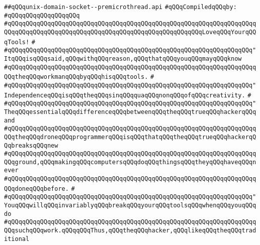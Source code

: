\label{src/lib/std/src/socket/unix-domain-socket--premicrothread.api}
\verb|##qQQqunix-domain-socket--premicrothread.api|\newline
\newline
\verb|#qQQqCompiledqQQqby:|\newline
\verb|#qQQqqQQqqQQqqQQqqQQq|\newline
\newline
\verb|#qQQqqQQqqQQqqQQqqQQqqQQqqQQqqQQqqQQqqQQqqQQqqQQqqQQqqQQqqQQqqQQqqQQqqQQqqQQqqQQqqQQqqQQqqQQqqQQqqQQqqQQqqQQqqQQqqQQqqQQqqQQqLoveqQQqYourqQQqTools!|\newline
\verb|#|\newline
\verb|#qQQqqQQqqQQqqQQqqQQqqQQqqQQqqQQqqQQqqQQqqQQqqQQqqQQqqQQqqQQqqQQqqQQq"ItqQQqisqQQqsaid,qQQqwithqQQqreason,qQQqthatqQQqyouqQQqmayqQQqknow|\newline
\verb|#qQQqqQQqqQQqqQQqqQQqqQQqqQQqqQQqqQQqqQQqqQQqqQQqqQQqqQQqqQQqqQQqqQQqqQQqtheqQQqworkmanqQQqbyqQQqhisqQQqtools.|\newline
\verb|#|\newline
\verb|#qQQqqQQqqQQqqQQqqQQqqQQqqQQqqQQqqQQqqQQqqQQqqQQqqQQqqQQqqQQqqQQqqQQq"IndependenceqQQqisqQQqtheqQQqsinqQQqquaqQQqnonqQQqofqQQqcreativity.|\newline
\verb|#|\newline
\verb|#qQQqqQQqqQQqqQQqqQQqqQQqqQQqqQQqqQQqqQQqqQQqqQQqqQQqqQQqqQQqqQQqqQQq"TheqQQqessentialqQQqdifferenceqQQqbetweenqQQqtheqQQqtrueqQQqhackerqQQqand|\newline
\verb|#qQQqqQQqqQQqqQQqqQQqqQQqqQQqqQQqqQQqqQQqqQQqqQQqqQQqqQQqqQQqqQQqqQQqqQQqtheqQQqdroneqQQqprogrammerqQQqisqQQqthatqQQqtheqQQqtrueqQQqhackerqQQqbreaksqQQqnew|\newline
\verb|#qQQqqQQqqQQqqQQqqQQqqQQqqQQqqQQqqQQqqQQqqQQqqQQqqQQqqQQqqQQqqQQqqQQqqQQqground,qQQqmakingqQQqcomputersqQQqdoqQQqthingsqQQqtheyqQQqhaveqQQqnever|\newline
\verb|#qQQqqQQqqQQqqQQqqQQqqQQqqQQqqQQqqQQqqQQqqQQqqQQqqQQqqQQqqQQqqQQqqQQqqQQqdoneqQQqbefore.|\newline
\verb|#|\newline
\verb|#qQQqqQQqqQQqqQQqqQQqqQQqqQQqqQQqqQQqqQQqqQQqqQQqqQQqqQQqqQQqqQQqqQQq"YouqQQqwillqQQqinvariablyqQQqbreakqQQqyourqQQqtoolsqQQqwhenqQQqyouqQQqdo|\newline
\verb|#qQQqqQQqqQQqqQQqqQQqqQQqqQQqqQQqqQQqqQQqqQQqqQQqqQQqqQQqqQQqqQQqqQQqqQQqsuchqQQqwork.qQQqqQQqThus,qQQqtheqQQqhacker,qQQqlikeqQQqtheqQQqtraditional|\newline
